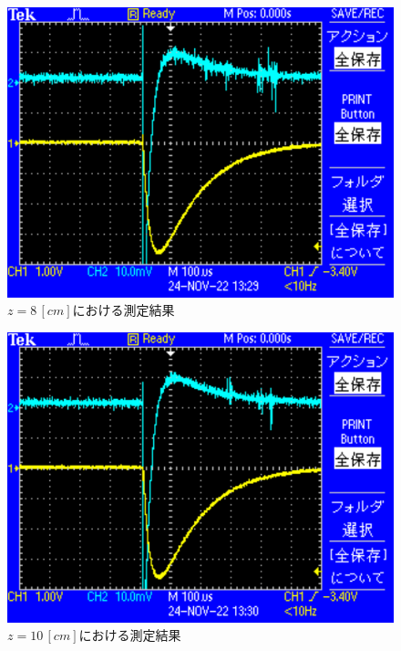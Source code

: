 \begin{figure}[H]
    \centering
    \includegraphics[scale=0.5]{images-5.pdf}
    \caption{$z=8\,[cm]$における測定結果}
\end{figure}

\begin{figure}[H]
    \centering
    \includegraphics[scale=0.5]{images-6.pdf}
    \caption{$z=10\,[cm]$における測定結果}
\end{figure}

